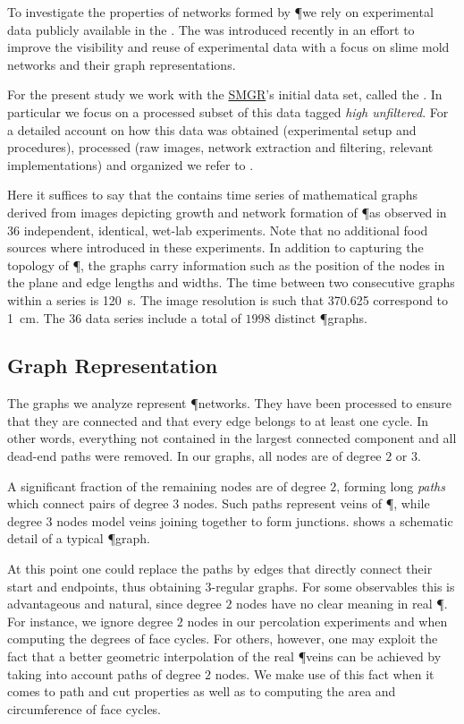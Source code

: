 		To investigate the properties of networks formed by \P we rely on experimental data publicly available in the \SMGR. The \SMGR was introduced recently in an effort to improve the visibility and reuse of experimental data with a focus on slime mold networks and their graph representations.
	
		For the present study we work with the \href{http://smgr.mpi-inf.mpg.de}{SMGR}'s initial data set, called the \data. In particular we focus on a processed subset of this data tagged \emph{high unfiltered}. For a detailed account on how this data was obtained (experimental setup and procedures), processed (raw images, network extraction and filtering, relevant implementations) and organized we refer to . 

		Here it suffices to say that the \data contains time series of mathematical graphs derived from images depicting growth and network formation of \P as observed in $36$ independent, identical, wet-lab experiments. Note that no additional food sources where introduced in these experiments. In addition to capturing the topology of \P, the graphs carry information such as the position of the nodes in the plane and edge lengths and widths. The time between two consecutive graphs within a series is \SI{120}{\second}. The image resolution is such that \SI{370.625}{\pixel} correspond to \SI{1}{\centi\metre}. The $36$ data series include a total of $1998$ distinct \P graphs. 

	\subsection{Graph Representation}

		The graphs we analyze represent \P networks. They have been processed to ensure that they are connected and that every edge belongs to at least one cycle. In other words, everything not contained in the largest connected component and all dead-end paths were removed. In our graphs, all nodes are of degree $2$ or $3$.

		A significant fraction of the remaining nodes are of degree $2$, forming long \emph{paths} which connect pairs of degree $3$ nodes. Such paths represent veins of \P, while degree $3$ nodes model veins joining together to form junctions.  shows a schematic detail of a typical \P graph.

		At this point one could replace the paths by edges that directly connect their start and endpoints, thus obtaining $3$-regular graphs. For some observables this is advantageous and natural, since degree $2$ nodes have no clear meaning in real \P. For instance, we ignore degree $2$ nodes in our percolation experiments and when computing the degrees of face cycles. For others, however, one may exploit the fact that a better geometric interpolation of the real \P veins can be achieved by taking into account paths of degree $2$ nodes. We make use of this fact when it comes to path and cut properties as well as to computing the area and circumference of face cycles.

